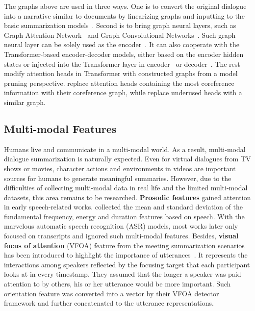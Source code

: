 The graphs above are used in three ways. One is to convert the original dialogue into a narrative similar to documents by linearizing graphs and inputting to the basic summarization models~\cite{fabbri2021convosumm,ganesh2019restructuring}.
Second is to bring graph neural layers, such as Graph Attention Network~\cite{velivckovic2018graph} and Graph Convolutional Networks~\cite{kipf2016semi}. Such graph neural layer can be solely used as the encoder~\cite{feng2021incorporating}. It can also cooperate with the Transformer-based encoder-decoder models, either based on the encoder hidden states or injected into the Transformer layer in encoder~\cite{liu2021coreference} or decoder~\cite{chen2021structure}.
The rest modify attention heads in Transformer with constructed graphs from a model pruning perspective. \citet{liu2021coreference} replace attention heads containing the most coreference information with their coreference graph, while \citet{liu2023picking} replace underused heads with a similar graph.





\subsection{Multi-modal Features}

Humans live and communicate in a multi-modal world. As a result, multi-modal dialogue summarization is naturally expected. Even for virtual dialogues from TV shows or movies, character actions and environments in videos are important sources for humans to generate meaningful summaries. However, due to the difficulties of collecting multi-modal data in real life and the limited multi-modal datasets, this area remains to be researched. 
\textbf{Prosodic features} gained attention in early speech-related works.
\citet{murray2005extractive} collected the mean and standard deviation of the fundamental frequency, energy and duration features based on speech. %
With the marvelous automatic speech recognition (ASR) models, most works later only focused on transcripts and ignored such multi-modal features.
Besides, \textbf{visual focus of 
attention} {(VFOA)} feature from the meeting summarization scenarios 
has been introduced to highlight the importance of utterances~\cite{li2019keep}. 
It represents the interactions among speakers reflected by the focusing target that each participant looks at in every timestamp. They assumed that the longer a speaker was paid attention to by others, his or her utterance would be more important. Such orientation feature was converted into a vector by their VFOA detector framework and further concatenated to the utterance representations. 

